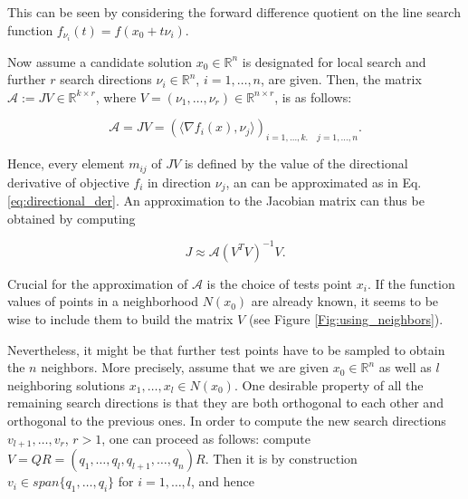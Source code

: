 This can be seen by considering the forward difference quotient on the line search function $f_{\nu_i}(t) = f(x_0 + t \nu_i)$.

Now assume a candidate solution $x_0 \in \mathbb{R}^n$ is designated for local search and further $r$ search directions $\nu_i \in \mathbb{R}^n$, $i = 1,\ldots,n$, are given. Then, the matrix $\mathcal{A} := JV \in \mathbb{R}^{k \times r}$, where $V = (\nu_1, \ldots, \nu_r) \in \mathbb{R}^{n \times r}$, is as follows:

\begin{equation}
\mathcal{A} = JV = (\langle \nabla f_i(x), \nu_j \rangle)_{i = 1, \ldots, k. \quad j = 1,\ldots,n}.
\label{eq:neigh_matrix}
\end{equation}

Hence, every element $m_{ij}$ of $JV$ is defined by the value of the directional derivative of objective $f_i$ in direction $\nu_j$, an can be approximated as in Eq. \eqref{eq:directional_der}. An approximation to the Jacobian matrix can thus be obtained by computing

\begin{equation}
J \approx \mathcal{A} (V^T V)^{-1} V.
\label{eq:jacobian_approx}
\end{equation}

Crucial for the approximation of $\mathcal{A}$ is the choice of tests point $x_i$. If the function values of points in a neighborhood $N(x_0)$ are already known, it seems to be wise to include them to build the matrix $V$ (see Figure \ref{Fig:using_neighbors}). 

\begin{comment}

\begin{figure}[H] 
	\centering \def\svgwidth{150pt} 
	 
	\caption{Neighbors used for the approximation of the Jacobian are spotted as triangles, squares are points outside the neighborhood $N(x_0)$} 
	\label{Fig:using_neighbors}
\end{figure}

\end{comment}

Nevertheless, it might be that further test points have to be sampled to obtain the $n$ neighbors. More precisely, assume that we are given $x_0 \in \mathbb{R}^n$ as well as $l$ neighboring solutions $x_1, \ldots, x_l \in N(x_0)$. One desirable property of all the remaining search directions is that they are both orthogonal to each other and orthogonal to the previous ones. In order to compute the new search directions $v_{l+1}, \ldots, v_r$, $r > 1$, one can proceed as follows: compute $V = QR = (q_1, \ldots, q_l, q_{l+1}, \ldots, q_n)R$. Then it is by construction $v_i \in span\{ q_1, \ldots, q_i \}$ for $i = 1, \ldots, l$, and hence

